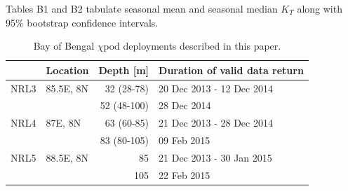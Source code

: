 \documentclass[onecol]{ametsoc}
\begin{document}
\appendix[C]
Tables B1 and B2 tabulate seasonal mean and seasonal median \(K_T\) along with 95\% bootstrap confidence intervals.




\begin{table}[t]
\caption{\label{tab:pods}
Bay of Bengal \(\chi\)pod deployments described in this paper.}
\centering
\begin{tabular*}{0.7\textwidth}{@{\extracolsep\fill}llrl}
\toprule
 & Location & Depth [m] & Duration of valid data return\\
\midrule
NRL3 & 85.5E, 8N & 32 (28-78) & 20 Dec 2013 - 12 Dec 2014\\
 &  & 52 (48-100) & \phantom{20 Dec 2013 -} 28 Dec 2014\\
\midrule
NRL4 & 87E, 8N & 63 (60-85) & 21 Dec 2013 - 28 Dec 2014\\
 &  & 83 (80-105) & \phantom{21 Dec 2013 -} 09 Feb 2015\\
\midrule
NRL5 & 88.5E, 8N & 85 & 21 Dec 2013 - 30 Jan 2015\\
 &  & 105 & \phantom{21 Dec 2013 -} 22 Feb 2015\\
\bottomrule
\end{tabular*}
\end{table}

\begin{table}
\label{tab:means}
\footnotesize
\centering
{}

\end{table}

\begin{table}
\label{tab:medians}
\footnotesize
\centering
{}

\end{table}
\end{document}
